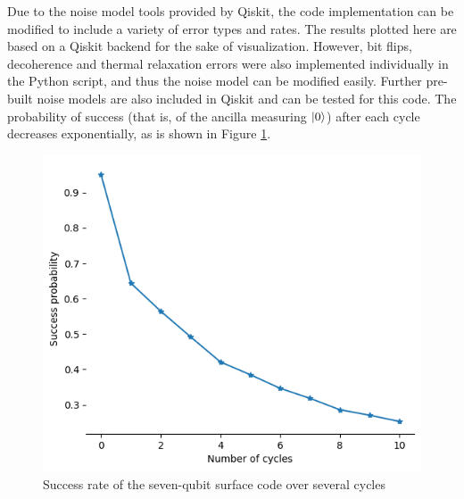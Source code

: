 Due to the noise model tools provided by Qiskit, the code implementation can be modified to include a variety of error types and rates. The results plotted here are based on a Qiskit backend for the sake of visualization. However, bit flips, decoherence and thermal relaxation errors were also implemented individually in the Python script, and thus the noise model can be modified easily. Further pre-built noise models are also included in Qiskit and can be tested for this code. The probability of success (that is, of the ancilla measuring $\ket{0}$) after each cycle decreases exponentially, as is shown in Figure \ref{fig:success_rate_SC}.

\begin{figure}
    \centering
    \includegraphics[scale=0.5]{Success_rate_SC.png}
    \caption{Success rate of the seven-qubit surface code over several cycles}
    \label{fig:success_rate_SC}
\end{figure}

